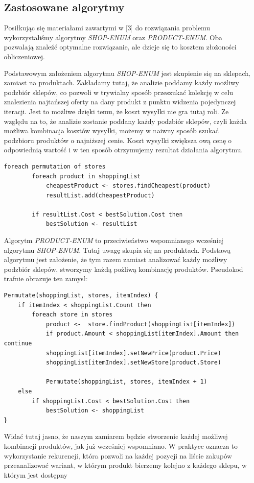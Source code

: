 \documentclass[a4paper]{article}
\begin{document}
\subsection{Zastosowane algorytmy}
Posiłkując się materiałami zawartymi w [3] do rozwiązania problemu wykorzystaliśmy algorytmy \textit{SHOP-ENUM} oraz \textit{PRODUCT-ENUM}. Oba pozwalają znaleźć optymalne rozwiązanie, ale dzieje się to kosztem złożoności obliczeniowej.

Podstawowym założeniem algorytmu \textit{SHOP-ENUM} jest skupienie się na sklepach, zamiast na produktach. Zakładamy tutaj, że analizie poddamy każdy możliwy podzbiór sklepów, co pozwoli w trywialny sposób przeszukać kolekcję w celu znalezienia najtańszej oferty na dany produkt z punktu widzenia pojedynczej iteracji. Jest to możliwe dzięki temu, że koszt wysyłki nie gra tutaj roli. Ze względu na to, że analizie zostanie poddany każdy podzbiór sklepów, czyli każda możliwa kombinacja kosztów wysyłki, możemy w naiwny sposób szukać podzbioru produktów o najniższej cenie. Koszt wysyłki zwiększa ową cenę o odpowiednią wartość i w ten sposób otrzymujemy rezultat działania algorytmu.
\vspace{0.5 cm}
\lstset{style=sharpc}
\begin{lstlisting}
foreach permutation of stores
		foreach product in shoppingList
			cheapestProduct <- stores.findCheapest(product)
			resultList.add(cheapestProduct)
		
		if resultList.Cost < bestSolution.Cost then
			bestSolution <- resultList
\end{lstlisting}
\vspace{0.5 cm}

Algorytm \textit{PRODUCT-ENUM} to przeciwieństwo wspomnianego wcześniej algorytmu \textit{SHOP-ENUM}. Tutaj uwagę skupia się na produktach. Podstawą algorytmu jest założenie, że tym razem zamiast analizować każdy możliwy podzbiór sklepów, stworzymy każdą pożliwą kombinację produktów. Pseudokod trafnie obrazuje ten zamysł:

\vspace{0.5 cm}
\lstset{style=sharpc}
\begin{lstlisting}
Permutate(shoppingList, stores, itemIndex) {
	if itemIndex < shoppingList.Count then
		foreach store in stores 
			product <-  store.findProduct(shoppingList[itemIndex])
			if product.Amount < shoppingList[itemIndex].Amount then continue
			shoppingList[itemIndex].setNewPrice(product.Price)
			shoppingList[itemIndex].setNewStore(product.Store)
		
			Permutate(shoppingList, stores, itemIndex + 1)
	else
		if shoppingList.Cost < bestSolution.Cost then
			bestSolution <- shoppingList
}
\end{lstlisting}
\vspace{0.5 cm}
Widać tutaj jasno, że naszym zamiarem będzie stworzenie każdej możliwej kombinacji produktów, jak już wcześniej wspomniano. W praktyce oznacza to wykorzystanie rekurencji, która pozwoli na każdej pozycji na liście zakupów przeanalizować wariant, w którym produkt bierzemy kolejno z każdego sklepu, w którym jest dostępny
\end{document}
